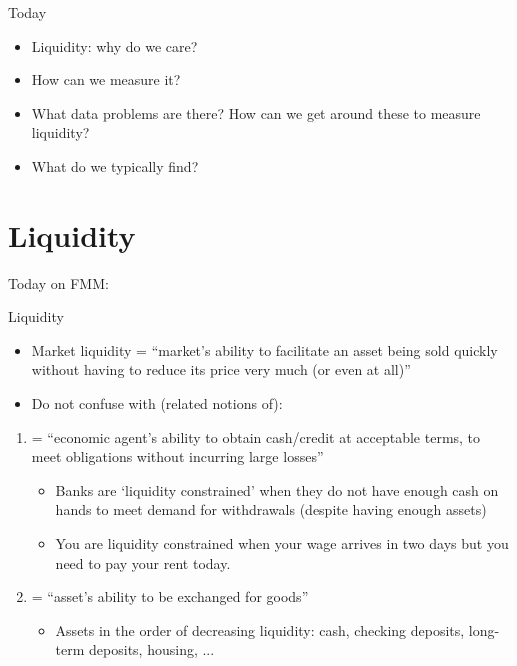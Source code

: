 \documentclass[english,10pt]{beamer}
\begin{document}
\begin{frame}{Today}
	\begin{itemize}
		\item Liquidity: why do we care?
		\item How can we measure it?
		\item What data problems are there? How can we get around these to measure liquidity?
		\item What do we typically find?
	\end{itemize}
\end{frame}


\section{Liquidity}

\begin{frame}{Today on FMM:}
	\tableofcontents[currentsection]
\end{frame}


\begin{frame}{Liquidity}
\begin{itemize}
	\item \alert{Market liquidity} = ``market's ability to facilitate an asset being sold quickly without having to reduce its price very much (or even at all)''
	\item Do not confuse with (related notions of):
\end{itemize}
\begin{enumerate}
	\item {} = ``economic agent's ability to obtain cash/credit at acceptable terms, to meet obligations without incurring large losses''
	\begin{itemize}
		\item Banks are `liquidity constrained' when they do not have enough cash on hands to meet demand for withdrawals (despite having enough assets)
		\item You are liquidity constrained when your wage arrives in two days but you need to pay your rent today.
	\end{itemize}
	\item {} = ``asset's ability to be exchanged for goods''
	\begin{itemize}
		\item Assets in the order of decreasing liquidity: cash, checking deposits, long-term deposits, housing, ...
	\end{itemize}
\end{enumerate}
\end{frame}
\end{document}
